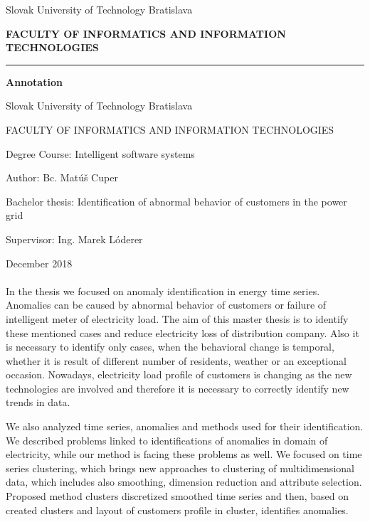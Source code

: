 \documentclass[a4paper,twoside,slovak,12pt,appendix]{article}
\begin{document}
\begin{titlepage}
\begin{center}
  {\small Slovak University of Technology Bratislava \par}
  {\small \textbf{FACULTY OF INFORMATICS AND INFORMATION TECHNOLOGIES}}
  \rule{\textwidth}{1pt}

  \vspace*{1.5cm}
  \begin{Large}
    \textbf{Annotation} \par
  \end{Large}
\end{center}
{Slovak University of Technology Bratislava \par}
{FACULTY OF INFORMATICS AND INFORMATION TECHNOLOGIES \par}
{Degree Course: Intelligent software systems \par}
{Author: Bc. Matúš Cuper \par}
{Bachelor thesis: Identification of abnormal behavior of customers in the power grid \par}
{Supervisor: Ing. Marek Lóderer \par}
{December 2018 \\} \\
In the thesis we focused on anomaly identification in energy time series.
Anomalies can be caused by abnormal behavior of customers or failure of
intelligent meter of electricity load. The aim of this master thesis is to
identify these mentioned cases and reduce electricity loss of distribution
company. Also it is necessary to identify only cases, when the behavioral change
is temporal, whether it is result of different number of residents, weather or
an exceptional occasion. Nowadays, electricity load profile of customers is
changing as the new technologies are involved and therefore it is necessary to
correctly identify new trends in data.

We also analyzed time series, anomalies and methods used for their
identification. We described problems linked to identifications of anomalies in
domain of electricity, while our method is facing these problems as well. We
focused on time series clustering, which brings new approaches to clustering of
multidimensional data, which includes also smoothing, dimension reduction and
attribute selection. Proposed method clusters discretized smoothed time series
and then, based on created clusters and layout of customers profile in cluster,
identifies anomalies.
\end{titlepage}
\end{document}
